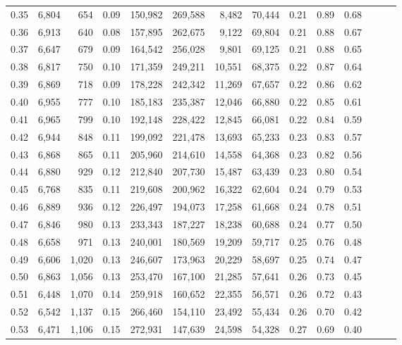 \begin{tabular}{rrrrrrrrrrrrrr}
0.35 &  6,804 &    654 &  0.09 &  150,982 &  269,588 &   8,482 &  70,444 &  0.21 &  0.89 &      0.68 \\
0.36 &  6,913 &    640 &  0.08 &  157,895 &  262,675 &   9,122 &  69,804 &  0.21 &  0.88 &      0.67 \\
0.37 &  6,647 &    679 &  0.09 &  164,542 &  256,028 &   9,801 &  69,125 &  0.21 &  0.88 &      0.65 \\
0.38 &  6,817 &    750 &  0.10 &  171,359 &  249,211 &  10,551 &  68,375 &  0.22 &  0.87 &      0.64 \\
0.39 &  6,869 &    718 &  0.09 &  178,228 &  242,342 &  11,269 &  67,657 &  0.22 &  0.86 &      0.62 \\
0.40 &  6,955 &    777 &  0.10 &  185,183 &  235,387 &  12,046 &  66,880 &  0.22 &  0.85 &      0.61 \\
0.41 &  6,965 &    799 &  0.10 &  192,148 &  228,422 &  12,845 &  66,081 &  0.22 &  0.84 &      0.59 \\
0.42 &  6,944 &    848 &  0.11 &  199,092 &  221,478 &  13,693 &  65,233 &  0.23 &  0.83 &      0.57 \\
0.43 &  6,868 &    865 &  0.11 &  205,960 &  214,610 &  14,558 &  64,368 &  0.23 &  0.82 &      0.56 \\
0.44 &  6,880 &    929 &  0.12 &  212,840 &  207,730 &  15,487 &  63,439 &  0.23 &  0.80 &      0.54 \\
0.45 &  6,768 &    835 &  0.11 &  219,608 &  200,962 &  16,322 &  62,604 &  0.24 &  0.79 &      0.53 \\
0.46 &  6,889 &    936 &  0.12 &  226,497 &  194,073 &  17,258 &  61,668 &  0.24 &  0.78 &      0.51 \\
0.47 &  6,846 &    980 &  0.13 &  233,343 &  187,227 &  18,238 &  60,688 &  0.24 &  0.77 &      0.50 \\
0.48 &  6,658 &    971 &  0.13 &  240,001 &  180,569 &  19,209 &  59,717 &  0.25 &  0.76 &      0.48 \\
0.49 &  6,606 &  1,020 &  0.13 &  246,607 &  173,963 &  20,229 &  58,697 &  0.25 &  0.74 &      0.47 \\
0.50 &  6,863 &  1,056 &  0.13 &  253,470 &  167,100 &  21,285 &  57,641 &  0.26 &  0.73 &      0.45 \\
0.51 &  6,448 &  1,070 &  0.14 &  259,918 &  160,652 &  22,355 &  56,571 &  0.26 &  0.72 &      0.43 \\
0.52 &  6,542 &  1,137 &  0.15 &  266,460 &  154,110 &  23,492 &  55,434 &  0.26 &  0.70 &      0.42 \\
0.53 &  6,471 &  1,106 &  0.15 &  272,931 &  147,639 &  24,598 &  54,328 &  0.27 &  0.69 &      0.40 \\

\end{tabular}
